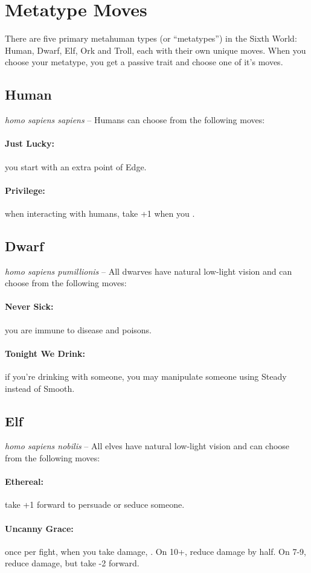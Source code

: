\section{Metatype Moves}
There are five primary metahuman types (or ``metatypes'') in the Sixth World: Human, Dwarf, Elf, Ork and Troll, each with their own unique moves. When you choose your metatype, you get a passive trait and choose one of it's moves.

\subsection*{Human}
\textit{homo sapiens sapiens} -- Humans can choose from the following moves:
\paragraph{Just Lucky:} you start with an extra point of Edge.
\paragraph{Privilege:} when interacting with humans, take +1 when you .

\subsection*{Dwarf}
\textit{homo sapiens pumillionis} -- All dwarves have natural low-light vision and can choose from the following moves:
\paragraph{Never Sick:} you are immune to disease and poisons.
\paragraph{Tonight We Drink:} if you’re drinking with someone, you may manipulate someone using Steady instead of Smooth.

\subsection*{Elf}
\textit{homo sapiens nobilis} -- All elves have natural low-light vision and can choose from the following moves:
\paragraph{Ethereal:} take +1 forward to persuade or seduce someone.
\paragraph{Uncanny Grace:} once per fight, when you take damage, . On 10+, reduce damage by half. On 7-9, reduce damage, but take -2 forward.

